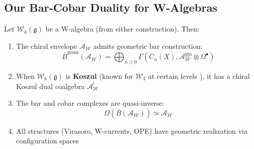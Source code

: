 \subsection{Our Bar-Cobar Duality for W-Algebras}

\begin{theorem}\label{thm:w-algebra-bar-cobar}
Let $\mathcal{W}_k(\mathfrak{g})$ be a W-algebra (from either construction). Then:
\begin{enumerate}
\item The chiral envelope $\mathcal{A}_{\mathcal{W}}$ admits geometric bar 
      construction:
      $$\bar{B}^{\text{geom}}(\mathcal{A}_{\mathcal{W}}) = \bigoplus_{n \geq 0} 
      \Gamma\left(\overline{C}_n(X), \mathcal{A}_{\mathcal{W}}^{\boxtimes n} 
      \otimes \Omega^\bullet\right)$$
      
\item When $\mathcal{W}_k(\mathfrak{g})$ is \textbf{Koszul} (known for $\mathcal{W}_3$ 
      at certain levels \cite{Ara07}), it has a chiral Koszul dual coalgebra 
      $\mathcal{A}_{\mathcal{W}}^!$
      
\item The bar and cobar complexes are quasi-inverse:
      $$\Omega(\bar{B}(\mathcal{A}_{\mathcal{W}})) \simeq \mathcal{A}_{\mathcal{W}}$$
      
\item All structures (Virasoro, W-currents, OPE) have geometric realization via 
      configuration spaces
\end{enumerate}
\end{theorem}

